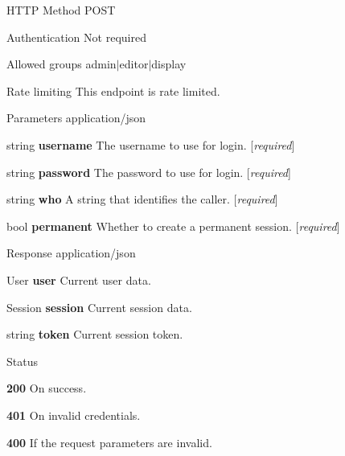 \begin{DoxyParagraph}{H\+T\+TP Method}
P\+O\+ST 
\end{DoxyParagraph}
\begin{DoxyParagraph}{Authentication}
Not required 
\end{DoxyParagraph}
\begin{DoxyParagraph}{Allowed groups}
{\ttfamily admin$\vert$editor$\vert$display} 
\end{DoxyParagraph}
\begin{DoxyParagraph}{Rate limiting}
This endpoint is rate limited.
\end{DoxyParagraph}
\begin{DoxyParagraph}{Parameters}
application/json
\begin{DoxyItemize}
\item {\ttfamily string} {\bfseries username} The username to use for login. \mbox{[}{\itshape required}\mbox{]}
\item {\ttfamily string} {\bfseries password} The password to use for login. \mbox{[}{\itshape required}\mbox{]}
\item {\ttfamily string} {\bfseries who} A string that identifies the caller. \mbox{[}{\itshape required}\mbox{]}
\item {\ttfamily bool} {\bfseries permanent} Whether to create a permanent session. \mbox{[}{\itshape required}\mbox{]}
\end{DoxyItemize}
\end{DoxyParagraph}
\begin{DoxyParagraph}{Response}
application/json
\begin{DoxyItemize}
\item {\ttfamily User} {\bfseries user} Current user data.
\item {\ttfamily Session} {\bfseries session} Current session data.
\item {\ttfamily string} {\bfseries token} Current session token.
\end{DoxyItemize}
\end{DoxyParagraph}
\begin{DoxyParagraph}{Status}

\begin{DoxyItemize}
\item {\bfseries 200} On success.
\item {\bfseries 401} On invalid credentials.
\item {\bfseries 400} If the request parameters are invalid. 
\end{DoxyItemize}
\end{DoxyParagraph}

